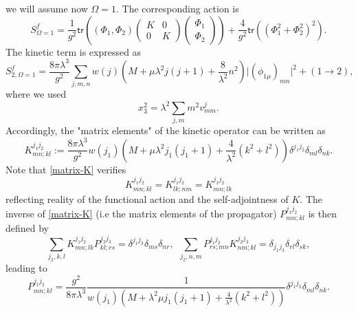 \documentclass[11pt]{book}
\newcommand{\tr}{\mathsf{tr}}
\theoremstyle{break}
\begin{document}
we will assume now $\Omega=1$. The corresponding action is%
%
\begin{equation}
S^f_{\Omega=1} = \frac{1}{g^2} \tr( (\Phi_1,\Phi_2)
\begin{pmatrix}
K&0\\
0&K
\end{pmatrix} 
\begin{pmatrix}
\Phi_1\\
\Phi_2
\end{pmatrix} 
)
+ \frac{4}{g^2} \tr( (\Phi_1^2 + \Phi_2^2)^2).\label{critical-action}
\end{equation}
%
The kinetic term is expressed as 
\begin{equation}
S^f_{2, \Omega=1}=\frac{8\pi\lambda^3}{g^2}\sum_{j,m,n}w(j)(M+\mu\lambda^2j(j+1)+\frac{8}{\lambda^2}n^2)\vert(\phi_{1\mu})_{mn}\vert^2+(1\to2)\label{kin-omega1},
\end{equation}
where we used
\begin{equation}
x_3^2 = \lambda^2 \sum_{j,m} m^2 v^j_{mm}.
\end{equation}
Accordingly, the "matrix elements" of the kinetic operator can be written as
\begin{equation}
K^{j_1 j_2}_{mn;kl} := \frac{8\pi\lambda^3}{g^2} w(j_1) ( M + \mu \lambda^2 j_1 (j_1+1) + \frac{4}{\lambda^2} (k^2+l^2) ) \delta^{j_1j_2} \delta_{ml} \delta_{nk}. \label{matrix-K} 
\end{equation}
Note that \eqref{matrix-K} verifies%
%
\begin{equation}
K^{j_1j_2}_{mn;kl} = K^{j_1j_2}_{lk;nm} = K^{j_1j_2}_{mn;lk} \label{sym-K}
\end{equation}
%
reflecting reality of the functional action and the self-adjointness of $K$. The inverse of \eqref{matrix-K} (i.e the matrix elements of the propagator) $P^{j_1j_2}_{mn;kl}$ is then defined by%
%
\begin{equation}
\sum_{j_2,k,l} K^{j_1j_2}_{mn;lk} P^{j_2j_3}_{kl;rs} = \delta^{j_1j_3} \delta_{ms} \delta_{nr}, \ \ \sum_{j_2,n,m} P^{j_1j_2}_{rs;mn} K^{j_2j_3}_{nm;kl} = \delta_{j_1j_3} \delta_{rl} \delta_{sk}, \label{propagator-def}
\end{equation}
%
leading to%
%
\begin{equation}
P^{j_1j_2}_{mn;kl} = \frac{g^2}{8\pi\lambda^3} \frac{1}{w(j_1)(M+\lambda^2\mu j_1(j_1+1)+\frac{4}{\lambda^2}(k^2+l^2))}\delta^{j_1j_2}\delta_{ml}\delta_{nk}.  \label{propagator}
\end{equation}

\end{document}
